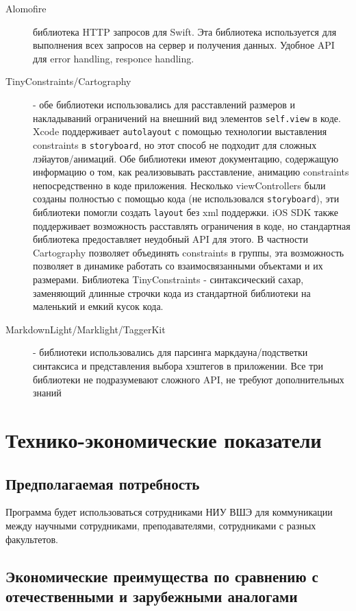 \documentclass[a4paper,12pt]{article}
\begin{document}
	\begin{description}
		\item [Alomofire] библиотека HTTP запросов для Swift. Эта библиотека используется для выполнения всех запросов на сервер \cite{server} и получения данных. Удобное API для error handling, responce handling.
		\item [TinyConstraints/Cartography] - обе библиотеки использовались для расставлений размеров и накладываний ограничений на внешний вид элементов \verb|self.view| в коде. Xcode поддерживает \verb|autolayout| с помощью технологии выставления constraints в \verb|storyboard|, но этот способ не подходит для сложных лэйаутов/анимаций. Обе библиотеки имеют документацию, содержащую информацию о том, как реализовывать расставление, анимацию constraints непосредственно в коде приложения. Несколько viewControllers были созданы полностью с помощью кода (не использовался \verb|storyboard|), эти библиотеки помогли создать \verb|layout| без xml поддержки. iOS SDK также поддерживает возможность расставлять ограничения в коде, но стандартная библиотека предоставляет неудобный API для этого. В частности Cartography позволяет объединять constraints  в группы, эта возможность позволяет в динамике работать со взаимосвязанными объектами и их размерами. Библиотека TinyConstraints - синтаксический сахар, заменяющий длинные строчки кода из стандартной библиотеки на маленький и емкий кусок кода.
		\item [MarkdownLight/Marklight/TaggerKit] - библиотеки использовались для парсинга маркдауна/подстветки синтаксиса и представления выбора хэштегов в приложении. Все три библиотеки не подразумевают сложного API, не требуют дополнительных знаний
	\end{description}
	
						\newpage
	\section{Технико-экономические показатели}
	\subsection{Предполагаемая потребность}
	Программа будет использоваться сотрудниками НИУ ВШЭ для коммуникации между научными сотрудниками, преподавателями, сотрудниками с разных факультетов.
	
	
	\subsection{Экономические преимущества по сравнению с отечественными и зарубежными аналогами}
	
\end{document}
